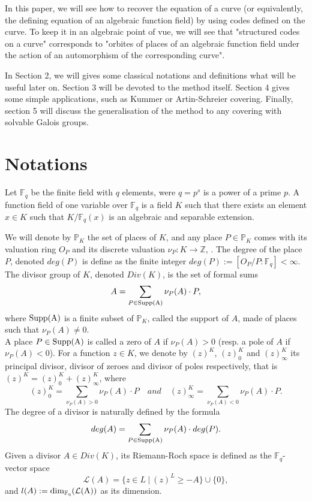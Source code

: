 \documentclass[10pt]{article}
\newcommand{\s}{\vspace{0.3cm}}
\newcommand{\cd}{\cdot}
\newcommand{\Z}{\mathbb{Z}}
\newcommand{\fq}{\mathbb{F}_q}
\begin{document}
\s

In this paper, we will see how to recover the equation of a curve (or equivalently, the defining equation of an algebraic function field) by using codes defined on the curve. To keep it in an algebraic point of vue, we will see that "structured codes on a curve" corresponds to "orbites of places of an algebraic function field under the action of an automorphism of the corresponding curve".

\s

In Section 2, we will gives some classical notations and definitions what will be useful later on. Section 3 will be devoted to the method itself. Section 4 gives some simple applications, such as Kummer or Artin-Schreier covering. Finally, section 5 will discuss the generalisation of the method to any covering with solvable Galois groups. 

\s

\section{Notations}

\s

Let $\fq$ be the finite field with $q$ elements, were $q=p^s$ is a power of a prime $p$. A function field of one variable over $\fq$ is a field $K$ such that there exists an element $x\in K$ such that $K/\fq(x)$ is an algebraic and separable extension. 

We will denote by $\mathbb{P}_K$ the set of places of $K$, and any place $P \in \mathbb{P}_K$ comes with its valuation ring $O_P$ and its discrete valuation $\nu_P : K \rightarrow \Z$, . The degree of the place $P$, denoted $deg(P)$ is define as the finite integer $deg(P) := [O_P/P:\fq] < \infty$.
The divisor group of $K$, denoted $Div(K)$, is the set of formal sums 
\[A = \sum\limits_{P \in \rm{Supp}(A)} \nu_P(A) \cd P,\]
where $\rm{Supp}(A)$ is a finite subset of $\mathbb{P}_K$, called the support of $A$, made of places such that $\nu_{P}(A) \neq 0$. \\ A place  $P \in \rm{Supp}(A)$ is called a zero of $A$ if $\nu_P(A) >0$ (resp. a pole of $A$ if $\nu_P(A) < 0$). For a function $z \in K$, we denote by $(z)^K$, $(z)^K_0$ and $(z)^K_{\infty}$ its principal divisor, divisor of zeroes and divisor of poles respectively, that is $(z)^K = (z)^K_0 + (z)^K_{\infty}$, where 
\[(z)^K_0 = \sum\limits_{\nu_P(A) > 0}\nu_P(A) \cd P \quad and \quad (z)^K_{\infty} = \sum\limits_{\nu_P(A) < 0}\nu_P(A) \cd P.\]
The degree of a divisor is naturally defined by the formula
\[deg(A) = \sum\limits_{P \in \rm{Supp}(A)} \nu_P(A) \cd deg(P).\]
Given a divisor $A \in Div(K)$, its Riemann-Roch space is defined as the $\fq$-vector space
\[\mathcal{L}(A) = \{z \in L \ | \ (z)^L \geq -A\} \cup \{0\},\]
and $l(A):= \rm{dim}_{\fq}(\mathcal{L}(A))$ as its dimension.
\end{document}
